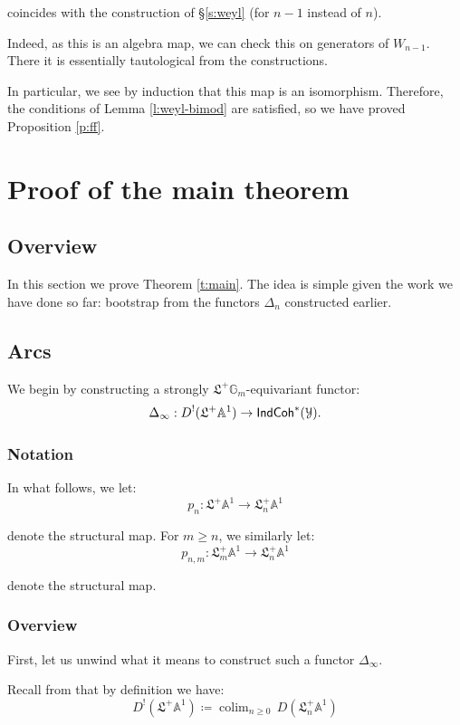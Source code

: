 \documentclass[reqno,11pt]{amsart}
\numberwithin{equation}{subsection}
\theoremstyle{remark}
\newcommand{\bA}{{\mathbb A}}
\newcommand{\bG}{{\mathbb G}}
\newcommand{\sY}{{\EuScript Y}}
\newcommand{\fL}{{\mathfrak L}}
\newcommand{\on}{\operatorname}
\newcommand{\colim}{\on{colim}}
\newcommand{\IndCoh}{\mathsf{IndCoh}}
\begin{document}
\noindent coincides with the construction of \S \ref{s:weyl} (for $n-1$ instead of $n$).

Indeed, as this is an algebra map, we can check this on generators of
$W_{n-1}$. There it is essentially tautological from the constructions.

In particular, we see by induction that this map is an isomorphism.
Therefore, the conditions of Lemma \ref{l:weyl-bimod} are satisfied,
so we have proved Proposition \ref{p:ff}.

\section{Proof of the main theorem}\label{s:main}

\subsection{Overview}

In this section we prove Theorem \ref{t:main}. The idea is simple given the
work we have done so far: bootstrap from the functors $\Delta_n$ constructed
earlier.


\subsection{Arcs}\label{ss:delta-arcs}

We begin by constructing a strongly $\fL^+\bG_m$-equivariant functor:
%
\[
\Delta_{\infty}:D^!(\fL^+\bA^1) \to \IndCoh^*(\sY).
\]

\subsubsection{Notation}

In what follows, we let:
%
\[
p_n:\fL^+ \bA^1 \to \fL_n^+\bA^1
\]

\noindent denote the structural map.
For $m \geq n$, we similarly let: 
%
\[
p_{n,m}:\fL_m^+\bA^1 \to \fL_n^+\bA^1 
\]

\noindent denote the structural map.

\subsubsection{Overview}

First, let us unwind what it means to construct such a functor
$\Delta_{\infty}$.

Recall from \cite{dmod} that by definition we have: 
%
\[
D^!(\fL^+\bA^1) \coloneqq \colim_{n \geq 0} \, D(\fL_n^+\bA^1)  
\]
\end{document}
